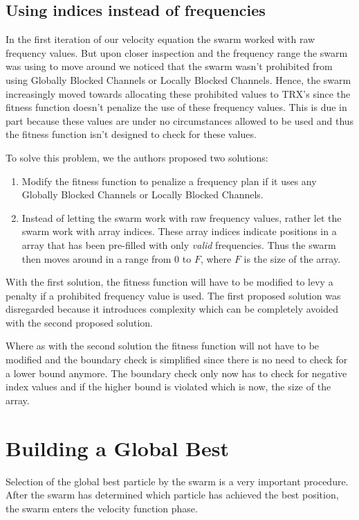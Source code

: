\subsection{Using indices instead of frequencies}
In the first iteration of our velocity equation the swarm worked with raw frequency values. But upon closer inspection and the frequency range the swarm was using to move around we noticed that the swarm wasn't prohibited from using Globally Blocked Channels or Locally Blocked Channels. Hence, the swarm increasingly moved towards allocating these prohibited values to TRX's since the fitness function doesn't penalize the use of these frequency values. This is due in part because these values are under no circumstances allowed to be used and thus the fitness function isn't designed to check for these values.

To solve this problem, we the authors proposed two solutions:
\begin{enumerate}
\item Modify the fitness function to penalize a frequency plan if it uses any Globally Blocked Channels or Locally Blocked Channels.
\item Instead of letting the swarm work with raw frequency values, rather let the swarm work with array indices. These array indices indicate positions in a array that has been pre-filled with only \emph{valid} frequencies. Thus the swarm then moves around in a range from 0 to $F$, where $F$ is the size of the array.
\end{enumerate}

With the first solution, the fitness function will have to be modified to levy a penalty if a prohibited frequency value is used. The first proposed solution was disregarded because it introduces complexity which can be completely avoided with the second proposed solution.

Where as with the second solution the fitness function will not have to be modified and the boundary check is simplified since there is no need to check for a lower bound anymore. The boundary check only now has to check for negative index values and if the higher bound is violated which is now, the size of the array.

\section{Building a Global Best}
Selection of the global best particle by the swarm is a very important procedure. After the swarm has determined which particle has achieved the best position, the swarm enters the velocity function phase. 

